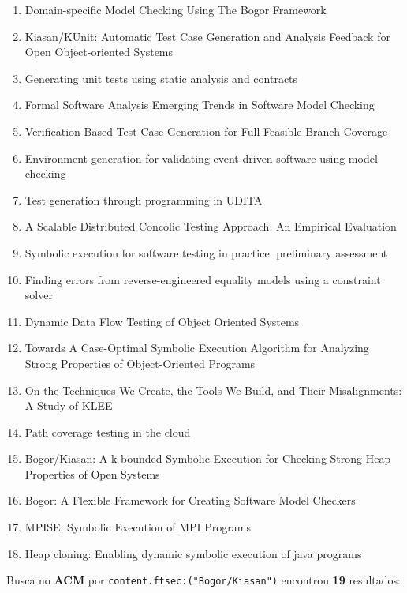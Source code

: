 \begin{enumerate}
\item Domain-specific Model Checking Using The Bogor Framework
\item Kiasan/KUnit: Automatic Test Case Generation and Analysis Feedback for Open Object-oriented Systems
\item Generating unit tests using static analysis and contracts
\item Formal Software Analysis Emerging Trends in Software Model Checking
\item Verification-Based Test Case Generation for Full Feasible Branch Coverage
\item Environment generation for validating event-driven software using model checking
\item Test generation through programming in UDITA
\item A Scalable Distributed Concolic Testing Approach: An Empirical Evaluation
\item Symbolic execution for software testing in practice: preliminary assessment
\item Finding errors from reverse-engineered equality models using a constraint solver
\item Dynamic Data Flow Testing of Object Oriented Systems
\item Towards A Case-Optimal Symbolic Execution Algorithm for Analyzing Strong Properties of Object-Oriented Programs
\item On the Techniques We Create, the Tools We Build, and Their Misalignments: A Study of KLEE
\item Path coverage testing in the cloud
\item Bogor/Kiasan: A k-bounded Symbolic Execution for Checking Strong Heap Properties of Open Systems
\item Bogor: A Flexible Framework for Creating Software Model Checkers
\item MPISE: Symbolic Execution of MPI Programs
\item Heap cloning: Enabling dynamic symbolic execution of java programs
\end{enumerate}

Busca no {\bf ACM} por
\texttt{content.ftsec:("Bogor/Kiasan")}
encontrou {\bf 19}
resultados:

